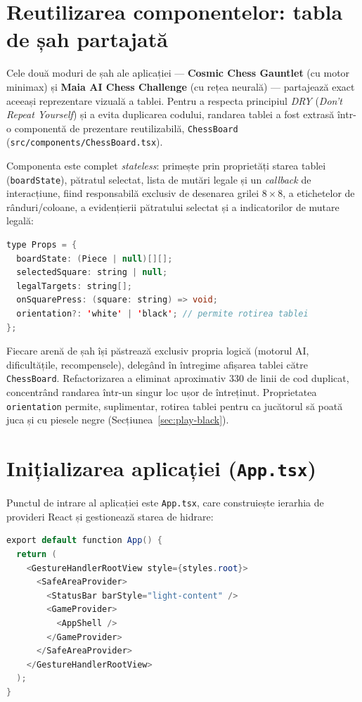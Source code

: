 \documentclass[12pt, a4paper, twoside]{report}
\numberwithin{equation}{section}
\begin{document}
\section{Reutilizarea componentelor: tabla de șah partajată}

Cele două moduri de șah ale aplicației — \textbf{Cosmic Chess Gauntlet} (cu motor minimax)
și \textbf{Maia AI Chess Challenge} (cu rețea neurală) — partajează exact aceeași
reprezentare vizuală a tablei. Pentru a respecta principiul \textit{DRY} (\textit{Don't
Repeat Yourself}) și a evita duplicarea codului, randarea tablei a fost extrasă într-o
componentă de prezentare reutilizabilă, \texttt{ChessBoard} (\texttt{src/components/ChessBoard.tsx}).

Componenta este complet \textit{stateless}: primește prin proprietăți starea tablei
(\texttt{boardState}), pătratul selectat, lista de mutări legale și un \textit{callback}
de interacțiune, fiind responsabilă exclusiv de desenarea grilei $8\times8$, a etichetelor
de rânduri/coloane, a evidențierii pătratului selectat și a indicatorilor de mutare legală:

\begin{lstlisting}[language=Java, caption={Interfața componentei reutilizabile ChessBoard}]
type Props = {
  boardState: (Piece | null)[][];
  selectedSquare: string | null;
  legalTargets: string[];
  onSquarePress: (square: string) => void;
  orientation?: 'white' | 'black'; // permite rotirea tablei
};
\end{lstlisting}

Fiecare arenă de șah își păstrează exclusiv propria logică (motorul AI, dificultățile,
recompensele), delegând în întregime afișarea tablei către \texttt{ChessBoard}. Refactorizarea
a eliminat aproximativ 330 de linii de cod duplicat, concentrând randarea într-un singur loc
ușor de întreținut. Proprietatea \texttt{orientation} permite, suplimentar, rotirea tablei
pentru ca jucătorul să poată juca și cu piesele negre (Secțiunea~\ref{sec:play-black}).

\section{Inițializarea aplicației (\texttt{App.tsx})}

Punctul de intrare al aplicației este \texttt{App.tsx}, care construiește ierarhia
de provideri React și gestionează starea de hidrare:

\begin{lstlisting}[language=Java, caption={Ierarhia de provideri în App.tsx}]
export default function App() {
  return (
    <GestureHandlerRootView style={styles.root}>
      <SafeAreaProvider>
        <StatusBar barStyle="light-content" />
        <GameProvider>
          <AppShell />
        </GameProvider>
      </SafeAreaProvider>
    </GestureHandlerRootView>
  );
}
\end{lstlisting}
\end{document}
